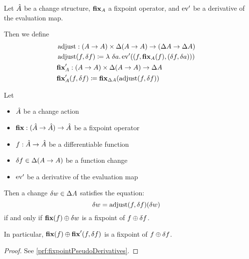 \begin{defn}
  Let $\hat{A}$ be a change structure, $\textbf{fix}_A$ a fixpoint operator, and
  $\operatorname{ev}'$ be a derivative of the evaluation map.

  Then we define
  \begin{align*}
    &\operatorname{adjust} : (A \rightarrow A) \times \Delta (A \rightarrow A) \rightarrow (\Delta A \rightarrow \Delta A)\\
    &\operatorname{adjust}(f, \delta f) \coloneqq \lambda\ \delta a . \operatorname{ev}'((f,
    \textbf{fix}_A(f), (\delta f, \delta a)))\\
    &\textbf{fix}_A' : (A \rightarrow A) \times \Delta (A \rightarrow A) \rightarrow \Delta A\\
    &\textbf{fix}_A'(f, \delta f) \coloneqq \textbf{fix}_{\Delta A}(\operatorname{adjust}(f, \delta f))
  \end{align*}
\end{defn}

\begin{thm}[name=Pseudo-derivatives of fixpoints, restate=fixpointPseudoDerivatives]
\label{thm:fixpointPseudoDerivatives}
  Let
  \begin{itemize}
    \item $\hat{A}$ be a change action
    \item $\textbf{fix} : (\hat{A} \rightarrow \hat{A}) \rightarrow \hat{A}$ be a fixpoint operator
    \item $f: \hat{A} \rightarrow \hat{A}$ be a differentiable function
    \item $\delta f \in \Delta (A \rightarrow A)$ be a function change 
    \item $\operatorname{ev}'$ be a derivative of the evaluation map
  \end{itemize}

  Then a change $\delta w \in \Delta A$ satisfies
  the equation:
  \begin{equation}\label{eqn:fixcondition}
    \delta w = \operatorname{adjust}(f, \delta f)(\delta w)
  \end{equation}
  if and only if $\textbf{fix}(f) \oplus \delta w$ is a fixpoint of $f \oplus \delta f$.

  In particular, $\textbf{fix}(f) \oplus \textbf{fix}'(f, \delta f)$ is a fixpoint
  of $f \oplus \delta f$.
\end{thm}
\ifproofs
\begin{proof}
  See \cref{prf:fixpointPseudoDerivatives}.
\end{proof}
\fi

